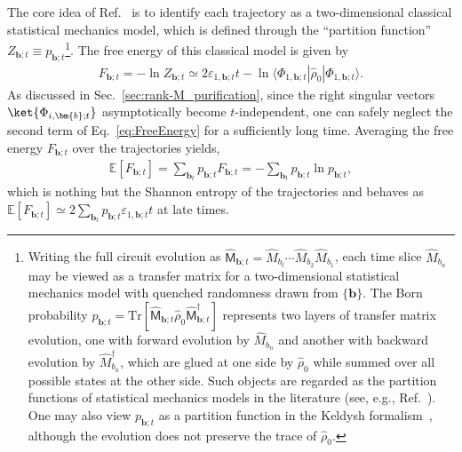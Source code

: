 \documentclass[preprint,pteplogo]{ptephy_v2}%
\numberwithin{equation}{section}
\theoremstyle{definition}
\newcommand{\mr}[1]{\mathrm{#1}}
\newcommand{\Tr}{\mr{Tr}}
\begin{document}
The core idea of Ref.~\cite{zabalo2022operator} is to identify each trajectory as a two-dimensional classical statistical mechanics model, which is defined through the ``partition function'' $Z_{\bm{b};t} \equiv p_{\bm{b};t}$\footnote{
Writing the full circuit evolution as $\hat{\mathsf{M}}_{\bm{b};t} = \hat{M}_{b_t} \cdots \hat{M}_{b_2} \hat{M}_{b_1}$, each time slice $\hat{M}_{b_n}$ may be viewed as a transfer matrix for a two-dimensional statistical mechanics model with quenched randomness drawn from $\{ \bm{b} \}$.
The Born probability $p_{\bm{b};t} = \Tr [\hat{\mathsf{M}}_{\bm{b};t} \hat{\rho}_0 \hat{\mathsf{M}}^\dagger_{\bm{b};t}]$ represents two layers of transfer matrix evolution, one with forward evolution by $\hat{M}_{b_n}$ and another with backward evolution by $\hat{M}_{b_n}^\dagger$, which are glued at one side by $\hat{\rho}_0$ while summed over all possible states at the other side.
Such objects are regarded as the partition functions of statistical mechanics models in the literature (see, e.g., Ref.~\cite{Jian2020measurement}).
One may also view $p_{\bm{b};t}$ as a partition function in the Keldysh formalism~\cite{Kamenev2023field}, although the evolution does not preserve the trace of $\hat{\rho}_0$.
}.
The free energy of this classical model is given by 
\begin{align} \label{eq:FreeEnergy}
F_{\bm{b};t} 
= -\ln Z_{\bm{b};t}
\simeq 2\varepsilon_{1,\bm{b};t} t -\ln \langle \Phi_{1,\bm{b};t} | \hat{\rho}_0 | \Phi_{1,\bm{b};t} \rangle.
\end{align}
As discussed in Sec.~\ref{sec:rank-M_purification}, since the right singular vectors $\ket{\Phi_{i,\bm{b};t}}$ asymptotically become $t$-independent, one can safely neglect the second term of Eq.~\eqref{eq:FreeEnergy} for a sufficiently long time.
Averaging the free energy $F_{\bm{b};t}$ over the trajectories yields,
\begin{align}
\mathbb{E}[F_{\bm{b};t}] 
= \sum_{\bm{b}_t}p_{\bm{b};t} F_{\bm{b};t} 
= -\sum_{\bm{b}_t} p_{\bm{b};t} \ln p_{\bm{b};t},
\end{align}
which is nothing but the Shannon entropy of the trajectories and behaves as $\mathbb{E}[F_{\bm{b};t}] \simeq 2\sum_{\bm{b}_t} p_{\bm{b};t} \varepsilon_{1,\bm{b};t} t$ at late times.
\end{document}
